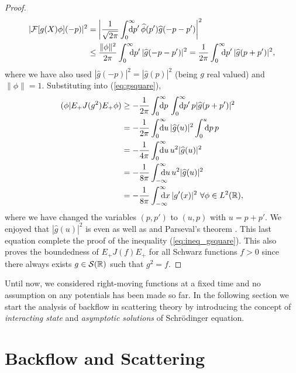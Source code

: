 \begin{proof}
	\begin{equation}
	\begin{aligned}
	|\mathcal{F}[g(X)\phi](-p)|^2&=\left|\frac{1}{\sqrt{2\pi}}\int_{0}^{\infty}\nspace\nspace \dd p'\, \hat{\phi}(p')\hat{g}(-p-p')\right|^2\\ &\le\frac{\|\phi\|^2}{2\pi}\int_{0}^{\infty}\nspace\! \dd p'\, |\hat{g}(-p-p')|^2=
	\frac{1}{2\pi}\int_{0}^{\infty}\nspace\! \dd p'\, |\hat{g}(p+p')|^2,
	\end{aligned}
	\end{equation}
	where we have also used $|\hat{g}(-p)|^2=|\hat{g}(p)|^2$ (being $g$ real valued) and $\|\phi\|=1$. Substituting into (\ref{eq:gsquare}),
	\begin{equation}
	\begin{aligned}
	(\phi|E_+J(g^2)E_+\phi)& \ge -\frac{1}{2\pi}\int_{0}^{\infty}\nspace\nspace \dd p\,\int_{0}^{\infty}\nspace\nspace \dd p'\, p|\hat{g}(p+p')|^2\\
	& = -\frac{1}{2\pi}\int_{0}^{\infty}\nspace\nspace \dd u\, |\hat{g}(u)|^2\int_{0}^{u}\nspace \dd p\, p\\
	& = -\frac{1}{4\pi}\int_{0}^{\infty}\nspace\nspace \dd u\, u^2|\hat{g}(u)|^2\\
	& = -\frac{1}{8\pi}\int_{-\infty}^{\infty}\nspace\nspace \dd u\, u^2|\hat{g}(u)|^2\\
	& = -\frac{1}{8\pi}\int_{-\infty}^{\infty}\nspace\nspace \dd x\, |g'(x)|^2 \ \forall \phi\in L^2(\mR),
	\end{aligned}
	\end{equation}
	where we have changed the variables $(p,p')$ to $(u,p)$ with $u=p+p'$. We enjoyed that  $|\hat{g}(u)|^2$ is even as well as and Parseval's theorem . This last equation complete the proof of the inequality (\ref{eq:ineq_gsquare}). This also proves the boundedness of $E_+J(f)E_+$ for all Schwarz functions $f>0$ since there always exists $g\in\mathcal{S}({\mathbb R})$ such that $g^2=f$. 
\end{proof}

Until now, we considered right-moving functions at a fixed time and no assumption on any potentials has been made so far. In the following section we start the analysis of backflow in scattering theory by introducing the concept of \textit{interacting state} and \textit{asymptotic solutions} of Schr\"{o}dinger equation.

\section{Backflow and Scattering}

